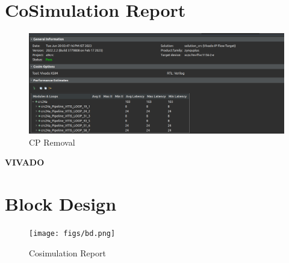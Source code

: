 \documentclass{article}
\begin{document}
\section{CoSimulation Report}
\vspace{1cm}
\begin{figure}[h]
    \centering
\includegraphics[width=\textwidth]{figs/3.png}
    \caption{CP Removal}
    \label{fig:my_label}
\end{figure}

\vspace{15cm}


\maketitle
\hfill \textbf{VIVADO}
\section{Block Design}
\vspace{1cm}
\begin{figure}[h]
    \centering
\texttt{[image: figs/bd.png]}
    \caption{Cosimulation Report}
    \label{fig:my_label}
\end{figure}
\vspace{3cm}
\end{document}
